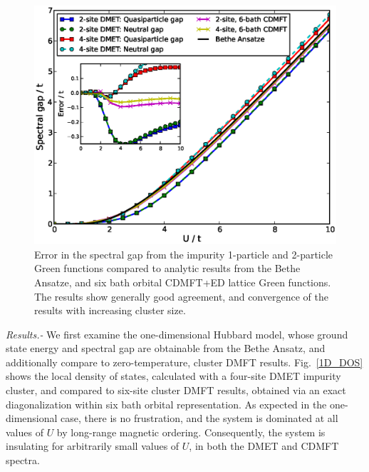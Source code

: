 \documentclass[aps,twocolumn,nobibnotes]{revtex4}
\begin{document}
\begin{figure}
\begin{center}
    \vspace{-2mm}
\includegraphics[scale=0.425]{Hubbard_Gap.eps}
\end{center}
    \vspace{-8mm}
\caption{Error in the spectral gap from the impurity 1-particle and 2-particle Green functions compared to analytic results
from the Bethe Ansatze\cite{Ovchinni1970}, and six bath orbital CDMFT+ED lattice Green functions. The results show generally 
good agreement, and convergence of the results with increasing cluster size.}
\label{1D_GAP}
\end{figure}

\emph{Results.-} We first examine the one-dimensional Hubbard model, whose ground state energy\cite{Lieb68} and spectral gap\cite{Ovchinni1970} are 
obtainable from the Bethe Ansatz, and additionally compare to
zero-temperature, cluster DMFT results\cite{Go2009}. Fig.~\ref{1D_DOS} shows the local density of states, calculated with a four-site DMET 
impurity cluster, and compared to six-site cluster DMFT results, obtained via an exact diagonalization within six bath orbital representation. 
As expected in the one-dimensional case, there is no
frustration, and the system is dominated at all values of $U$ by long-range magnetic ordering\cite{Lieb68}. Consequently, 
the system is insulating for arbitrarily small values of $U$, in both the DMET and CDMFT spectra. 
\end{document}

